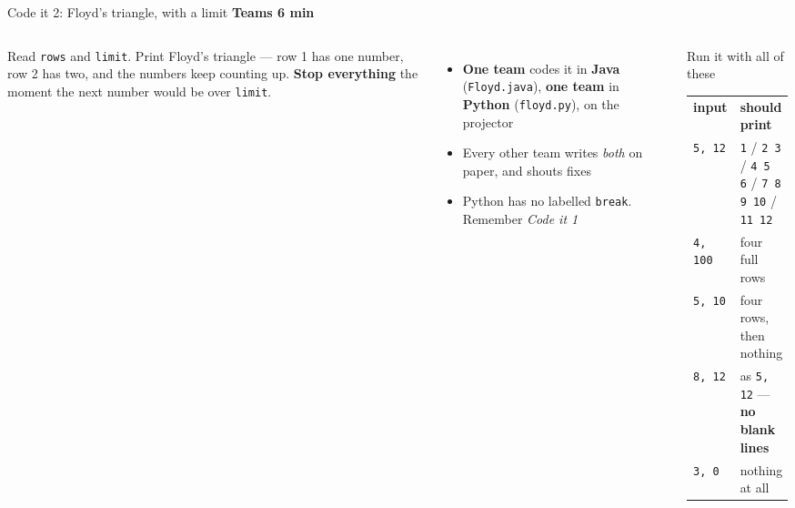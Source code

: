 \documentclass[aspectratio=169]{beamer}
\newcommand{\code}[1]{\texttt{#1}}
\newcommand{\timing}[2]{\hfill{\small\textcolor{bkblue}{\textbf{#1 \textbullet{} #2}}}}
\begin{document}
\begin{frame}[fragile]{Code it 2: Floyd's triangle, with a limit \timing{Teams}{6 min}}
  \begin{columns}[T,onlytextwidth]
    Read \code{rows} and \code{limit}. Print Floyd's triangle --- row 1 has one number,
    row 2 has two, and the numbers keep counting up. \textbf{Stop everything} the moment the
    next number would be over \code{limit}.
    \vspace{0.4em}

    \begin{itemize}[itemsep=0.2em]
      \small
      \item \textbf{One team} codes it in \textbf{Java} (\code{Floyd.java}), \textbf{one
        team} in \textbf{Python} (\code{floyd.py}), on the projector
      \item Every other team writes \emph{both} on paper, and shouts fixes
      \item Python has no labelled \code{break}. Remember \emph{Code it 1}
    \end{itemize}
    \begin{discussionbox}{Run it with all of these}
      \footnotesize
      \begin{tabular}{@{}p{0.22\linewidth}@{}p{0.76\linewidth}@{}}
        \textbf{input} & \textbf{should print}\\[0.15em]
        \code{5, 12}  & \code{1} / \code{2 3} / \code{4 5 6} / \code{7 8 9 10} /
          \code{11 12}\\[0.2em]
        \code{4, 100} & four full rows\\[0.2em]
        \code{5, 10}  & four rows, then nothing\\[0.2em]
        \code{8, 12}  & as \code{5, 12} --- \textbf{no blank lines}\\[0.2em]
        \code{3, 0}   & nothing at all\\
      \end{tabular}
    \end{discussionbox}
  \end{columns}
\end{frame}
\end{document}
